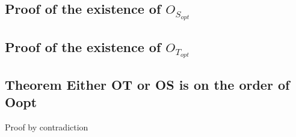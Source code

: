 \documentclass[11pt]{article}
\begin{document}
\subsection{Proof of the existence of $O_{S_{opt}}$}
\subsection{Proof of the existence of $O_{T_{opt}}$}












\subsection{Theorem Either OT or OS is on the order of Oopt}
Proof by contradiction










\end{document}
